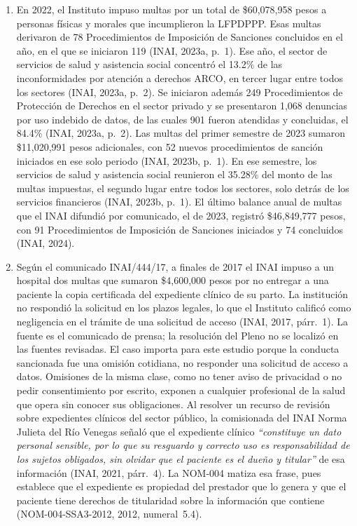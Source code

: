 \documentclass[12pt, a4paper]{article}
\begin{document}
\begin{enumerate}[label=\Roman*.]
  \item En 2022, el Instituto
  impuso multas por un total de \$60,078,958 pesos a personas físicas
  y morales que incumplieron la LFPDPPP. Esas multas derivaron de 78
  Procedimientos de Imposición de Sanciones concluidos en el año, en
  el que se iniciaron 119 (INAI, 2023a,
  p.~1). Ese año, el sector de servicios de salud y asistencia
  social concentró el 13.2\% de las inconformidades por atención a
  derechos ARCO, en tercer lugar entre todos los sectores (INAI,
  2023a, p.~2). Se iniciaron además 249 Procedimientos de
  Protección de Derechos en el sector privado y se presentaron
  1,068 denuncias por uso indebido de datos, de las cuales 901 fueron
  atendidas y concluidas, el 84.4\%
  (INAI, 2023a, p.~2). Las multas del primer semestre de 2023
  sumaron \$11,020,991 pesos adicionales, con 52 nuevos
  procedimientos de sanción iniciados en ese solo periodo (INAI,
  2023b, p.~1).
  En ese semestre, los servicios de salud y asistencia social
  reunieron el 35.28\% del monto de las multas impuestas, el segundo
  lugar entre todos los sectores, solo detrás de los servicios
  financieros (INAI, 2023b, p.~1). El último balance anual de multas
  que el INAI difundió por comunicado, el de 2023, registró
  \$46,849,777 pesos, con 91 Procedimientos de Imposición de
  Sanciones iniciados y 74 concluidos (INAI, 2024).
 
  \item Según el comunicado INAI/444/17, a finales de 2017 el INAI
  impuso a un hospital dos multas que sumaron \$4,600,000 pesos por
  no entregar a una paciente la copia certificada del expediente
  clínico de su parto. La institución no respondió la solicitud en
  los plazos legales, lo que el Instituto calificó como negligencia
  en el trámite de una solicitud de acceso (INAI, 2017, párr.~1). La
  fuente es el comunicado de prensa; la resolución del Pleno no se
  localizó en las fuentes revisadas. El caso importa para
  este estudio porque la conducta sancionada fue una omisión
  cotidiana, no responder una solicitud de acceso a datos. Omisiones
  de la misma clase, como no tener aviso de privacidad o no pedir
  consentimiento por escrito, exponen a cualquier profesional de la
  salud que opera sin conocer sus obligaciones. Al resolver un
  recurso de revisión sobre expedientes clínicos del sector público,
  la comisionada del INAI Norma Julieta del Río Venegas señaló que
  el expediente clínico \textit{``constituye un dato personal
  sensible, por lo que su resguardo y correcto uso es responsabilidad
  de los sujetos obligados, sin olvidar que el paciente es el dueño y
  titular''} de esa información (INAI, 2021, párr.~4). La NOM-004
  matiza esa frase, pues establece que el expediente es propiedad
  del prestador que lo genera y que el paciente tiene derechos de
  titularidad sobre la información que contiene (NOM-004-SSA3-2012, 2012, numeral~5.4).
 

\end{enumerate}
\end{document}
